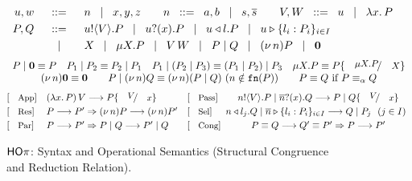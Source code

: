 	\begin{figure}
	\[
		\begin{array}{rcl}
			u,w &\;\;::=\;\;& n \;\;\;|\;\;\; x,y,z \qquad
			n \;\;::=\;\; a,b  \;\;\;|\;\;\; s, \overline{s} \qquad 
			V,W  \;\;::=\;\; u \;\;\;|\;\;\; \lambda x.\,P \\[1mm]
			P,Q & \;\;::=\;\; & u ! \langle V \rangle .{P}  \;\;\;|\;\;\;  u ? (x) .{P} \;\;\;|\;\;\;
			u \triangleleft l . P \;\;\;|\;\;\; u \triangleright \{l_i:P_i\}_{i \in I}   \\[1mm]
			& \;\;\;|\;\;\; & X \;\;\;|\;\;\; \mu X. P \;\;\;|\;\;\; V\, {W} \;\;\;|\;\;\; P\;|\; Q \;\;\;|\;\;\; (\nu\, n) P \;\;\;|\;\;\; \mathbf{0}
		\end{array}
	\]
	\[
	\begin{array}{c}
		P \Par \inact \scong P
		\quad
		P_1 \Par P_2 \scong P_2 \Par P_1
		\quad
		P_1 \Par (P_2 \Par P_3) \scong (P_1 \Par P_2) \Par P_3
		\quad 
		\recp{X}{P} \scong P\subst{\recp{X}{P}}{\rvar{X}}
		\\%

		\news{n} \inact \scong \inact
		\qquad 
		P \Par \news{n} Q \scong \news{n}(P \Par Q)
		\	(n \notin \fn{P})
		\qquad
		P \scong Q \textrm{ if } P \scong_\alpha Q
	\end{array}
\]
	\[
		\!\!\!\begin{array}{lllcrll}
			\orule{App} & (\abs{x}{P}) \, V   \red    P \subst{V}{x}
			& 
			  

			\orule{Pass} & \bout{n}{V} P \Par \binp{\dual{n}}{x} Q   \red   P \Par Q \subst{V}{x} 
			
			\\[1mm]

			 \orule{Res} & P \red P'  \Rightarrow  \news{n} P  \red  \news{n} P' 

			&  
			\orule{Sel}
			&  \!\!\! \bsel{n}{l_j} Q \Par \bbra{\dual{n}}{l_i : P_i}_{i \in I}  \red   Q \Par P_j ~~(j \in I)
			
			\\[1mm]
			\orule{Par} & P \red P'   \Rightarrow    P \Par Q  \red   P' \Par Q  
			&  
			\orule{Cong} & P \scong Q \red Q' \scong P'   \Rightarrow  P  \red  P' 
	\end{array}
	\]
	\vspace{-3mm}
\caption{$\mathsf{HO}\pi$: Syntax and Operational Semantics (Structural Congruence and Reduction Relation).
\label{fig:redsem}}
\end{figure}

